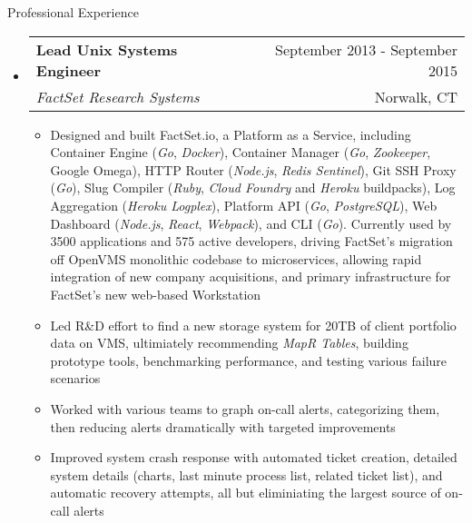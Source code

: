 \documentclass[letterpaper,10pt]{article}
\makeatletter
\newenvironment{ressection}[1]{
	\vspace{4pt}
	{\fontfamily{phv}\selectfont\Large#1}
	\begin{itemize}
	\vspace{3pt}
}{
	\end{itemize}
}
\newcommand{\ressubitem}[1]{
	\vspace{-1pt}
	\item \begin{flushleft} #1 \end{flushleft}
}
\newcommand{\resbigitem}[4]{
	\vspace{-5pt}
	\item
	\begin{tabular*}{6in}{l@{\extracolsep{\fill}}r}
		\textbf{#1} & #2 \\
		\textit{#3} & #4\\
	\end{tabular*}
}
\newenvironment{ressubsec}[4]{
	\resbigitem{#1}{#2}{#3}{#4}
	\vspace{-2pt}
	\begin{itemize}
}{
	\end{itemize}
}
\makeatother
\begin{document}
\begin{ressection}{Professional Experience}
	\begin{ressubsec}{Lead Unix Systems Engineer}{September 2013 - September 2015}{FactSet Research Systems}{Norwalk, CT}
		\ressubitem{Designed and built FactSet.io, a Platform as a Service, including Container Engine (\textit{Go}, \textit{Docker}), Container Manager (\textit{Go}, \textit{Zookeeper}, Google Omega), HTTP Router (\textit{Node.js}, \textit{Redis Sentinel}), Git SSH Proxy (\textit{Go}), Slug Compiler (\textit{Ruby}, \textit{Cloud Foundry} and \textit{Heroku} buildpacks), Log Aggregation (\textit{Heroku Logplex}), Platform API (\textit{Go}, \textit{PostgreSQL}), Web Dashboard (\textit{Node.js}, \textit{React}, \textit{Webpack}), and CLI (\textit{Go}).  Currently used by 3500 applications and 575 active developers, driving FactSet's migration off OpenVMS monolithic codebase to microservices, allowing rapid integration of new company acquisitions, and primary infrastructure for FactSet's new web-based Workstation}
		\ressubitem{Led R\&D effort to find a new storage system for 20TB of client portfolio data on VMS, ultimiately recommending \textit{MapR Tables}, building prototype tools, benchmarking performance, and testing various failure scenarios}
		\ressubitem{Worked with various teams to graph on-call alerts, categorizing them, then reducing alerts dramatically with targeted improvements}
		\ressubitem{Improved system crash response with automated ticket creation, detailed system details (charts, last minute process list, related ticket list), and automatic recovery attempts, all but eliminiating the largest source of on-call alerts}
	\end{ressubsec}



\end{ressection}
\end{document}
